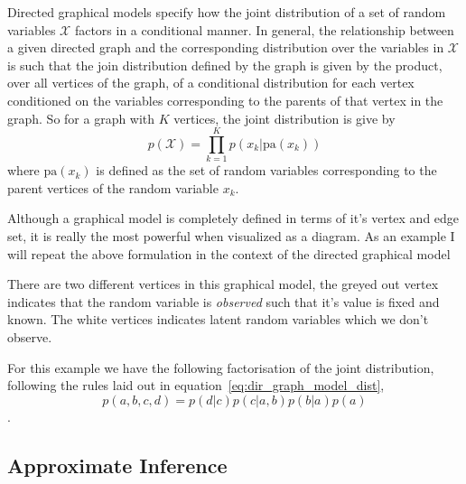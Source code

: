 Directed graphical models specify how the joint distribution of a set of random
variables $\mathcal{X}$ factors in a conditional manner. In general, the
relationship between a given directed graph and the corresponding distribution
over the variables in $\mathcal{X}$ is such that the join distribution defined
by the graph is given by the product, over all vertices of the graph, of a
conditional distribution for each vertex conditioned on the variables
corresponding to the parents of that vertex in the graph. So for a graph with
$K$ vertices, the joint distribution is give by
\begin{equation}
  \label{eq:dir_graph_model_dist}
  p(\mathcal{X}) = \prod_{k=1}^K p(x_k | \text{pa}(x_k))
\end{equation}
where $\text{pa}(x_k)$ is defined as the set of random variables corresponding
to the parent vertices of the random variable $x_k$.

Although a graphical model is completely defined in terms of it's vertex and
edge set, it is really the most powerful when visualized as a diagram. As an
example I will repeat the above formulation in the context of the directed
graphical model
\begin{figure}[H]
  \center
\end{figure}
There are two different vertices in this graphical model, the greyed out vertex
indicates that the random variable is \textit{observed} such that it's value is
fixed and known. The white vertices indicates latent random variables which we
don't observe.

For this example we have the following factorisation of the joint distribution,
following the rules laid out in equation~\eqref{eq:dir_graph_model_dist},
\begin{equation*}
  p(a, b, c, d) = p(d | c)p(c | a, b)p(b | a)p(a)
\end{equation*}.

\subsection{Approximate Inference}

